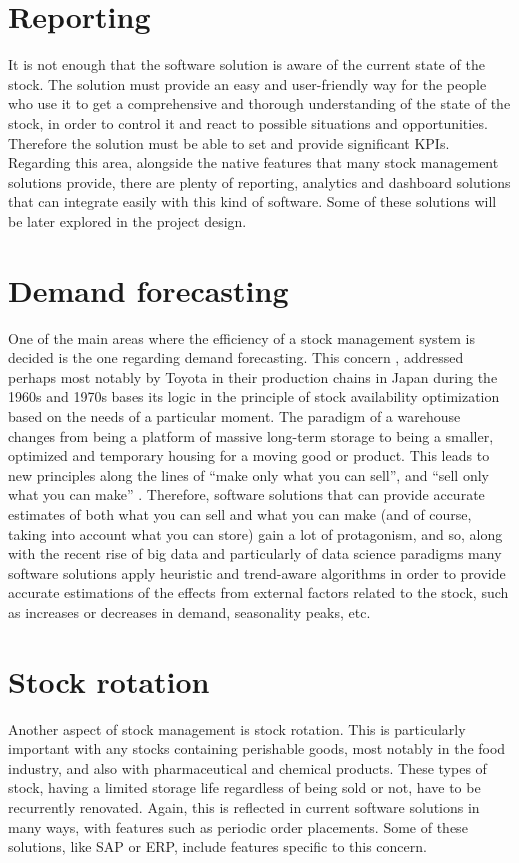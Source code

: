 \section{Reporting}
It is not enough that the software solution is aware of the current state of the stock. The solution must provide an easy and user-friendly way for the people who use it to get a comprehensive and thorough understanding of the state of the stock, in order to control it and react to possible situations and opportunities. Therefore the solution must be able to set and provide significant KPIs.
Regarding this area, alongside the native features that many stock management solutions provide, there are plenty of reporting, analytics and dashboard solutions that can integrate easily with this kind of software. Some of these solutions will be later explored in the project design.
\section{Demand forecasting}
One of the main areas where the efficiency of a stock management system is decided is the one regarding demand forecasting. This concern \cite{4}, addressed perhaps most notably by Toyota in their production chains in Japan during the 1960s and 1970s bases its logic in the principle of stock availability optimization based on the needs of a particular moment.
The paradigm of a warehouse changes from being a platform of massive long-term storage to being a smaller, optimized and temporary housing for a moving good or product. This leads to new principles along the lines of “make only what you can sell”, and “sell only what you can make” \cite{5}. Therefore, software solutions that can provide accurate estimates of both what you can sell and what you can make (and of course, taking into account what you can store) gain a lot of protagonism, and so, along with the recent rise of big data and particularly of data science paradigms many software solutions apply heuristic and trend-aware algorithms in order to provide accurate estimations of the effects from external factors related to the stock, such as increases or decreases in demand, seasonality peaks, etc.
\section{Stock rotation}
Another aspect of stock management is stock rotation. This is particularly important with any stocks containing perishable goods, most notably in the food industry, and also with pharmaceutical and chemical products. These types of stock, having a limited storage life regardless of being sold or not, have to be recurrently renovated. Again, this is reflected in current software solutions in many ways, with features such as periodic order placements. Some of these solutions, like SAP or ERP, include features specific to this concern.
